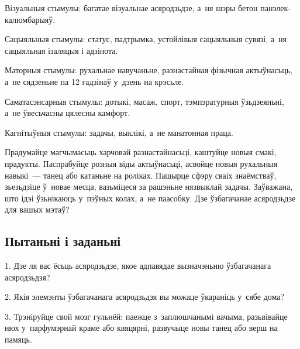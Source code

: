 Візуальныя стымулы: багатае візуальнае асяродзьдзе, а~ня шэры бетон панэлек-калюмбарыяў. 

Сацыяльныя стымулы: статус, падтрымка, устойлівыя сацыяльныя сувязі, а~ня сацыяльная ізаляцыя і адзінота. 

Маторныя стымулы: рухальнае навучаньне, разнастайная фізычная актыўнасьць, а~не сядзеньне па 12 гадзінаў у~дзень на крэсьле. 

Саматасэнсарныя стымулы: дотыкі, масаж, спорт, тэмпэратурныя ўзьдзеяньні, а~не ўвесьчасны цялесны камфорт.

Кагнітыўныя стымулы: задачы, выклікі, а~не манатонная праца.

Прадумайце магчымасьць харчовай разнастайнасьці, каштуйце новыя смакі, прадукты. Паспрабуйце розныя віды актыўнасьці, асвойце новыя рухальныя навыкі~--- танец або катаньне на роліках. Пашырце сфэру сваіх знаёмстваў, зьезьдзіце ў~новае месца, вазьміцеся за рашэньне нязвыклай задачы. Заўважана, што ідэі ўзьнікаюць у~пэўных колах, а~не паасобку. Дзе ўзбагачанае асяродзьдзе для вашых мэтаў?

\subsection*{Пытаньні і заданьні}

1. Дзе ля вас ёсьць асяродзьдзе, якое адпавядае вызначэньню ўзбагачанага асяродзьдзя?

2. Якія элемэнты ўзбагачанага асяродзьдзя вы можаце ўкараніць у~сябе дома?

3. Трэніруйце свой мозг гульнёй: паежце з~заплюшчанымі вачыма, разьвівайце нюх у~парфумэрнай краме або квяцярні, развучыце новы танец або верш на памяць.

